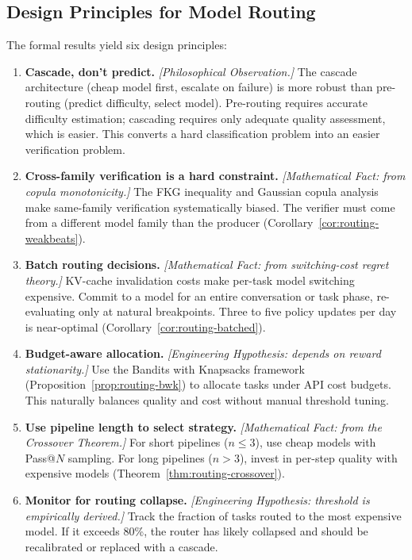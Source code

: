\documentclass[11pt, a4paper]{googledeepmind}
\begin{document}
\subsection{Design Principles for Model Routing}

The formal results yield six design principles:

\begin{enumerate}[nosep]
\item \textbf{Cascade, don't predict.} \emph{[Philosophical Observation.]} The cascade architecture (cheap model first, escalate on failure) is more robust than pre-routing (predict difficulty, select model). Pre-routing requires accurate difficulty estimation; cascading requires only adequate quality assessment, which is easier. This converts a hard classification problem into an easier verification problem.

\item \textbf{Cross-family verification is a hard constraint.} \emph{[Mathematical Fact: from copula monotonicity.]} The FKG inequality and Gaussian copula analysis make same-family verification systematically biased. The verifier must come from a different model family than the producer (Corollary~\ref{cor:routing-weakbeats}).

\item \textbf{Batch routing decisions.} \emph{[Mathematical Fact: from switching-cost regret theory.]} KV-cache invalidation costs make per-task model switching expensive. Commit to a model for an entire conversation or task phase, re-evaluating only at natural breakpoints. Three to five policy updates per day is near-optimal (Corollary~\ref{cor:routing-batched}).

\item \textbf{Budget-aware allocation.} \emph{[Engineering Hypothesis: depends on reward stationarity.]} Use the Bandits with Knapsacks framework (Proposition~\ref{prop:routing-bwk}) to allocate tasks under API cost budgets. This naturally balances quality and cost without manual threshold tuning.

\item \textbf{Use pipeline length to select strategy.} \emph{[Mathematical Fact: from the Crossover Theorem.]} For short pipelines ($n \leq 3$), use cheap models with Pass@$N$ sampling. For long pipelines ($n > 3$), invest in per-step quality with expensive models (Theorem~\ref{thm:routing-crossover}).

\item \textbf{Monitor for routing collapse.} \emph{[Engineering Hypothesis: threshold is empirically derived.]} Track the fraction of tasks routed to the most expensive model. If it exceeds 80\%, the router has likely collapsed and should be recalibrated or replaced with a cascade.
\end{enumerate}
\end{document}
